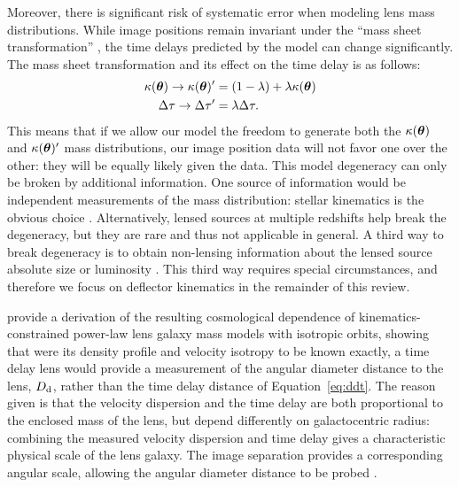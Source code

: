 Moreover, there is significant risk of systematic error when modeling
lens mass distributions. While image positions remain invariant under
the ``mass sheet transformation'' \citep{FGS85,S+S13}
\citep[and its generalization, the source-position transformation][]{SPT}, the time delays
predicted by the model can change significantly. The mass sheet transformation
and its effect on the time delay is as follows:
%
\begin{align}
    \kappa(\boldsymbol{\theta}) \rightarrow \kappa(\boldsymbol{\theta})' &= (1 - \lambda) + \lambda \kappa(\boldsymbol{\theta})  \label{eq:mst} \\
    \Delta \tau \rightarrow \Delta \tau' &= \lambda \Delta \tau.
\end{align}
%
This means that if we allow our model the freedom to generate both the
$\kappa(\boldsymbol{\theta})$ and $\kappa(\boldsymbol{\theta})'$ mass distributions, our image position
data will not favor one over the other: they will be equally likely
given the data. This model degeneracy can only be broken by additional
information. One source of information would be independent
measurements of the mass distribution: stellar kinematics is the
obvious choice \citep{Koo++03}. Alternatively, lensed sources at
multiple redshifts help break the degeneracy, but they are rare
\citep{Gav++08,Son++12} and thus not applicable in general. A third 
way to break degeneracy is to obtain non-lensing information about the
lensed source absolute size \citep{SBL11} or luminosity
\citep{Hol01}. This third way requires special circumstances, and therefore
we focus on deflector kinematics in the remainder of this review.

\citet{JeeKomatsuSuyu2015} provide a derivation of the resulting
cosmological dependence of kinematics-constrained power-law lens
galaxy mass models with isotropic orbits, showing that were its
density profile and velocity isotropy to be known exactly, a time
delay lens would provide a measurement of the angular diameter
distance to the lens, $D_{\rm d}$, rather than the time delay distance of
Equation~\ref{eq:ddt}. The reason given is that the velocity
dispersion and the time delay are both proportional to the enclosed
mass of the lens, but depend differently on galactocentric radius:
combining the measured velocity dispersion and time delay gives a
characteristic physical scale of the lens galaxy.  The image
separation provides a corresponding angular scale, allowing the
angular diameter distance to be probed \citep[see earlier work
by][]{GLB08}.

